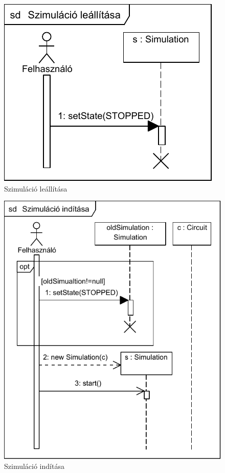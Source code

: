 \begin{figure}[H]
\begin{center}
\includegraphics{chapters/chapter03/seqdiagrams/sim_stop.pdf}
\caption{Szimuláció leállítása}
\label{fig:sim_stop}
\end{center}
\end{figure}

\begin{figure}[H]
\begin{center}
\includegraphics{chapters/chapter03/seqdiagrams/sim_start.pdf}
\caption{Szimuláció indítása}
\label{fig:sim_start}
\end{center}
\end{figure}

